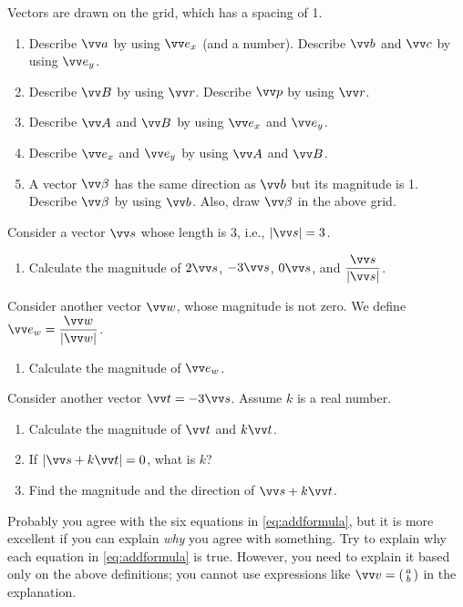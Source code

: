 \documentclass[11pt,pdfa,lastpage]{MishoNote}
\begin{document}
\begin{problems}
 \Problem[S] Vectors are drawn on the grid, which has a spacing of 1.
 \par\smallskip\par\usebox{\VectorSetA}
 \begin{enumerate}
   \item Describe $\vc a$ by using $\vvex$ (and a number).  Describe $\vc b$ and $\vc c$ by using $\vvey$.
   \item Describe $\vc B$ by using $\vc r$. Describe $\vc p$ by using $\vc r$.
   \item Describe $\vc A$ and $\vc B$ by using $\vvex$ and $\vvey$.
   \item Describe $\vvex$ and $\vvey$ by using $\vc A$ and $\vc B$.
   \item A vector $\vc \beta$ has the same direction as $\vc b$ but its magnitude is 1. Describe $\vc \beta$ by using $\vc b$. Also, draw $\vc \beta$ in the above grid.
 \end{enumerate}
\end{problems}
\begin{problems}
 \Problem[S] Consider a vector $\vc s$ whose length is 3, i.e., $|\vc s|=3$.
 \begin{enumerate}
   \item Calculate the magnitude of $2\vc s$, $-3\vc s$, $0\vc s$, and $\dfrac{\vc s}{|\vc s|}$.
 \end{enumerate}
 Consider another vector $\vc w$, whose magnitude is not zero. We define $\vc{e_w}= \dfrac{\vc w}{|\vc w|}$.
 \begin{enumerate}[resume]
  \item Calculate the magnitude of $\vc{e_w}$.
 \end{enumerate}
Consider another vector $\vc t=-3\vc s$. Assume $k$ is a real number.
\begin{enumerate}[resume]
  \item Calculate the magnitude of $\vc t$ and $k\vc t$. 
  \item If $|\vc s+k\vc t|=0$, what is $k$?
  \item Find the magnitude and the direction of $\vc s+k\vc t$.
 \end{enumerate}
 \Problem[B] Probably you agree with the six equations in \eqref{eq:addformula}, but it is more excellent if you can explain \emph{why} you agree with something. Try to explain why each equation in \eqref{eq:addformula} is true. However, you need to explain it based only on the above definitions; you cannot use expressions like $\vc v=\spmat{a\\b}$ in the explanation.\\%
\end{problems}
\end{document}
